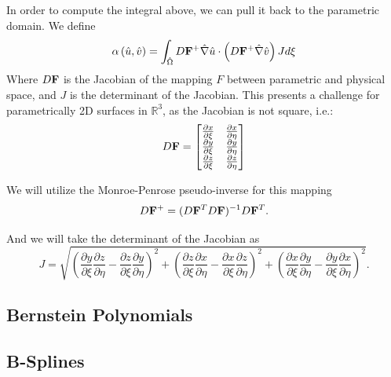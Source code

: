 \documentclass[preprint,1p,12pt]{elsarticle}
\begin{document}
In order to compute the integral above, we can pull it back to the parametric domain. We define
\begin{equation}
\alpha\left(\hat{u}, \hat{v}\right) = \int_{\hat{\Omega}} D\bold{F}^+\hat{\nabla}\hat{u} \cdot \left( D\bold{F}^+ \hat{\nabla}\hat{v} \right) J d \xi
\end{equation}
Where $D\bold{F}$ is the Jacobian of the mapping $F$ between parametric and physical space, and $J$ is the determinant of the Jacobian. This presents a challenge for parametrically 2D surfaces in $\mathbb{R}^3$, as the Jacobian is not square, i.e.:
\begin{equation}
D\bold{F} = \begin{bmatrix}
\frac{\partial x}{\partial \xi} & \frac{\partial x}{\partial \eta} \\
\frac{\partial y}{\partial \xi} & \frac{\partial y}{\partial \eta} \\
\frac{\partial z}{\partial \xi} & \frac{\partial z}{\partial \eta} 
\end{bmatrix}
\end{equation}

We will utilize the Monroe-Penrose pseudo-inverse for this mapping \cite{simpson_isogeometric_2017}
\begin{equation}
D\bold{F}^+ = (D\bold{F}^T D\bold{F})^{-1}D\bold{F}^T.
\end{equation}

And we will take the determinant of the Jacobian as
\begin{equation}
J = \sqrt{\left(\frac{\partial y}{\partial \xi}\frac{\partial z}{\partial \eta} - \frac{\partial z}{\partial \xi} \frac{\partial y}{\partial \eta}\right)^2 + \left(\frac{\partial z}{\partial \xi}  \frac{\partial x}{\partial \eta} - \frac{\partial x}{\partial \xi}\frac{\partial z}{\partial \eta} \right)^2 + \left(\frac{\partial x}{\partial \xi}\frac{\partial y}{\partial \eta} - \frac{\partial y}{\partial \xi} \frac{\partial x}{\partial \eta}\right)^2}.
\end{equation}

\subsection{Bernstein Polynomials}


\subsection{B-Splines}

\end{document}
